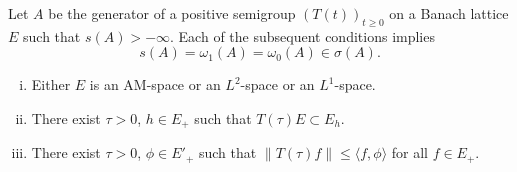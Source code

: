 \begin{theorem}\label{thm:c4-1.1}
Let $A$ be the generator of a positive semigroup $(T(t))_{t \geq 0}$ on a Banach lattice $E$ such that $s(A) > -\infty$.
Each of the subsequent conditions implies
\begin{equation*}\label{eq:c4-1.0-kgk}
s(A) = \omega_{1}(A) = \omega_{0}(A) \in \sigma(A) .
\end{equation*}

\begin{enumerate}[(i)] 
\item \label{thm:c4-1.1-1}
Either $E$ is an AM-space or an $L^{2}$-space or an $L^{1}$-space.
\item \label{thm:c4-1.1-2}
There exist $\tau > 0$, $h \in E_{+}$ such that $T(\tau)E \subset E_{h}$.
\item \label{thm:c4-1.1-3}
There exist $\tau > 0$, $\phi \in E'_{+}$ such that $\|T(\tau)f\| \leq \langle f,\phi\rangle$ for all $f \in E_{+}$.
\end{enumerate}
\end{theorem}


